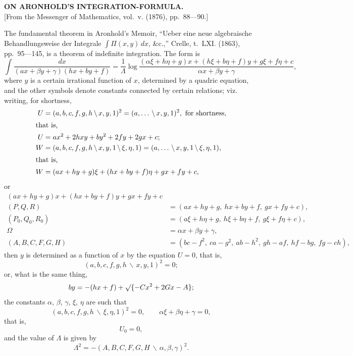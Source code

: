 \documentclass[11pt,a4paper]{book}
\begin{document}
\begin{center}
\textbf{ON ARONHOLD'S INTEGRATION-FORMULA.}\\[1em]
[From the Messenger of Mathematics, vol.~v. (1876), pp.~88---90.]
\end{center}

The fundamental theorem in Aronhold's Memoir, ``Ueber eine neue algebraische Behandlungsweise der Integrale $\int \Pi(x, y)\, dx$, \&c.,'' Crelle, t.~LXI. (1863), pp.~95---145, is a theorem of indefinite integration. The form is
\[
\int \frac{dx}{(ax + \beta y + \gamma)(hx + by + f)} = \frac{1}{\Lambda} \log \frac{(\alpha\xi + h\eta + g)x + (h\xi + b\eta + f)y + g\xi + f\eta + c}{\alpha x + \beta y + \gamma},
\]
where $y$ is a certain irrational function of $x$, determined by a quadric equation, and the other symbols denote constants connected by certain relations; viz. writing, for shortness,
\begin{align*}
U &= (a, b, c, f, g, h \,\backslash\, x, y, 1)^2 = (a, \ldots \,\backslash\, x, y, 1)^2, \text{ for shortness}, \\
\intertext{that is,}
U &= ax^2 + 2hxy + by^2 + 2fy + 2gx + c; \\
W &= (a, b, c, f, g, h \,\backslash\, x, y, 1 \,\backslash\, \xi, \eta, 1) = (a, \ldots \,\backslash\, x, y, 1 \,\backslash\, \xi, \eta, 1), \\
\intertext{that is,}
W &= (ax + hy + g)\xi + (hx + by + f)\eta + gx + fy + c,
\end{align*}
or
\begin{align*}
(ax + hy + g)x + (hx + by + f)y + gx + fy + c \\
(P, Q, R) &= (ax + hy + g,\ hx + by + f,\ gx + fy + c), \\
(P_0, Q_0, R_0) &= (a\xi + h\eta + g,\ h\xi + b\eta + f,\ g\xi + f\eta + c), \\
\Omega &= \alpha x + \beta y + \gamma, \\
(A, B, C, F, G, H) &= (bc - f^2,\ ca - g^2,\ ab - h^2,\ gh - af,\ hf - bg,\ fg - ch),
\end{align*}
then $y$ is determined as a function of $x$ by the equation $U = 0$, that is,
\[
(a, b, c, f, g, h \,\backslash\, x, y, 1)^2 = 0;
\]
or, what is the same thing,
\[
by = -(hx + f) + \surd\{-Cx^2 + 2Gx - A\};
\]
the constants $\alpha$, $\beta$, $\gamma$, $\xi$, $\eta$ are such that
\[
(a, b, c, f, g, h \,\backslash\, \xi, \eta, 1)^2 = 0, \qquad \alpha\xi + \beta\eta + \gamma = 0,
\]
that is,
\[
U_0 = 0,
\]
and the value of $\Lambda$ is given by
\[
\Lambda^2 = -(A, B, C, F, G, H \,\backslash\, \alpha, \beta, \gamma)^2.
\]
\end{document}
